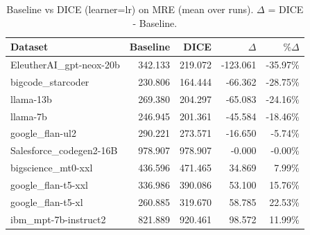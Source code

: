 \begin{table}[t]
\centering
\small
\caption{Baseline vs DICE (learner=lr) on MRE (mean over runs). $\Delta$ = DICE - Baseline.}
\label{tab:baseline-vs-dice-lr-MRE}
\begin{tabular}{lrrrr}
\toprule
Dataset & Baseline & DICE & $\Delta$ & $\%\Delta$ \\
\midrule
EleutherAI\_gpt-neox-20b & 342.133 & 219.072 & -123.061 & -35.97\% \\
bigcode\_starcoder & 230.806 & 164.444 & -66.362 & -28.75\% \\
llama-13b & 269.380 & 204.297 & -65.083 & -24.16\% \\
llama-7b & 246.945 & 201.361 & -45.584 & -18.46\% \\
google\_flan-ul2 & 290.221 & 273.571 & -16.650 & -5.74\% \\
Salesforce\_codegen2-16B & 978.907 & 978.907 & -0.000 & -0.00\% \\
bigscience\_mt0-xxl & 436.596 & 471.465 & 34.869 & 7.99\% \\
google\_flan-t5-xxl & 336.986 & 390.086 & 53.100 & 15.76\% \\
google\_flan-t5-xl & 260.885 & 319.670 & 58.785 & 22.53\% \\
ibm\_mpt-7b-instruct2 & 821.889 & 920.461 & 98.572 & 11.99\% \\
\bottomrule
\end{tabular}
\end{table}
